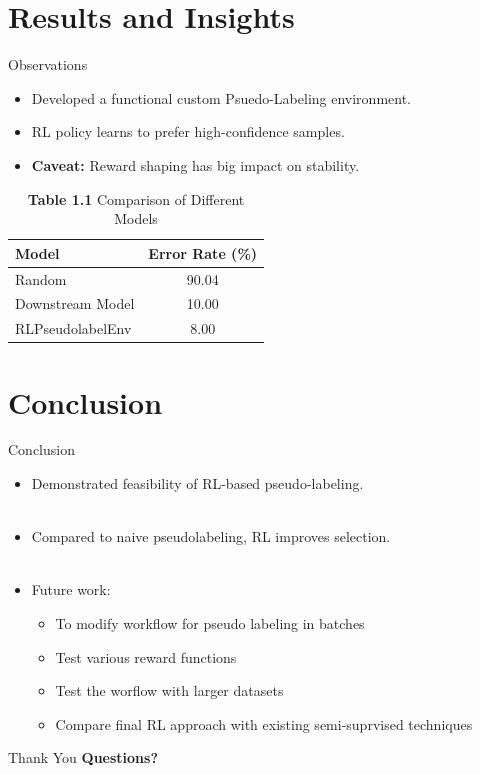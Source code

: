 \documentclass{beamer}
\begin{document}
\section{Results and Insights}
\begin{frame}{Observations}
  \begin{itemize}
    \item Developed a functional custom Psuedo-Labeling environment.
    \item RL policy learns to prefer high-confidence samples.
    \item \textbf{Caveat:} Reward shaping has big impact on stability.
  \end{itemize}

  \begin{table}[h!]
    \centering
    \begin{tabular}{|l|c|}
      \hline
      \textbf{Model} & \textbf{Error Rate (\%)} \\
      \hline
      Random & 90.04 \\
      Downstream Model & 10.00 \\
      RLPseudolabelEnv & 8.00 \\
      \hline
    \end{tabular}
    \caption*{\textbf{Table 1.1} Comparison of Different Models}
  \end{table}

\end{frame}


\section{Conclusion}
\begin{frame}{Conclusion}
  \begin{itemize}
    \item Demonstrated feasibility of RL-based pseudo-labeling. \\~\\
    \item Compared to naive pseudolabeling, RL improves selection. \\~\\
    \item Future work:
      \begin{itemize}
        \item To modify workflow for pseudo labeling in batches
        \item Test various reward functions
        \item Test the worflow with larger datasets
        \item Compare final RL approach with existing semi-suprvised techniques
      \end{itemize}
  \end{itemize}
\end{frame}


\begin{frame}{Thank You}
  \centering
  \textbf{Questions?}
\end{frame}
\end{document}
